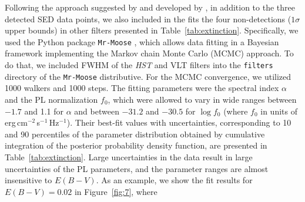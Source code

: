 \documentclass[pdftex,twocolumn]{aastex62}
\newcommand{\yus}[1]{{\color[rgb]{0.5,0.1,0.5}YS: #1}}
\newcommand{\gp}[1]{{\color{blue} #1}}
\begin{document}
%
Following the approach suggested by   \cite{Sawicki2012} and 
developed by  \cite{Drouart2018}, 
in addition to the three detected SED data points,
we also 
included in the fits the four non-detections ($1\sigma$ upper bounds) 
in other filters presented in Table~\ref{tab:extinction}.  
Specifically, we used the  Python package {\tt Mr-Moose}  \citep{Drouart2018}, which allows data fitting in a Bayesian 
framework implementing the Markov chain Monte Carlo (MCMC) approach. 
To do that, we included FWHM of the {\sl HST} and VLT filters into the {\tt filters} directory of the {\tt Mr-Moose} distributive. 
For the MCMC convergence, we 
utilized 
1000 walkers and 1000 steps.  
The fitting parameters were the spectral index $\alpha$ and the PL normalization $f_{0}$, which were
allowed to vary in wide ranges between $-1.7$  and 1.1 for $\alpha$ and between $-31.2$ and $-30.5$ 
    for  $\log f_0$ (where $f_0$ in units of erg\,cm$^{-2}$\,s$^{-1}$\,Hz$^{-1}$). 
Their best-fit values with uncertainties, corresponding to 10 and 90 percentiles of the parameter distribution obtained by cumulative integration of the posterior probability density function,
are presented in Table~\ref{tab:extinction}.
Large uncertainties in the data 
result in large uncertainties of the PL parameters, and the parameter ranges  are almost insensitive to $E(B-V)$.
As an example,  we show the fit results for $E(B-V)=0.02$ in Figure~\ref{fig:7}, where 
\end{document}
